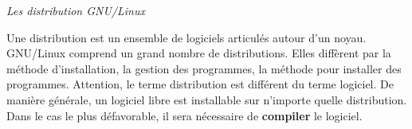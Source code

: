 \documentclass[10pt,fleqn]{article} %
\begin{document}
\begin{rem}
\textit{Les distribution GNU/Linux}

Une distribution est un ensemble de logiciels articulés autour d'un noyau. GNU/Linux comprend un grand nombre de distributions. Elles diffèrent par la méthode d'installation, la gestion des programmes, la méthode pour installer des programmes. Attention, le terme distribution est différent du terme logiciel. De manière générale, un logiciel libre est installable sur n'importe quelle distribution. Dans le cas le plus défavorable, il sera nécessaire de \textbf{compiler} le logiciel.


%
%
%

\end{rem}
\end{document}
